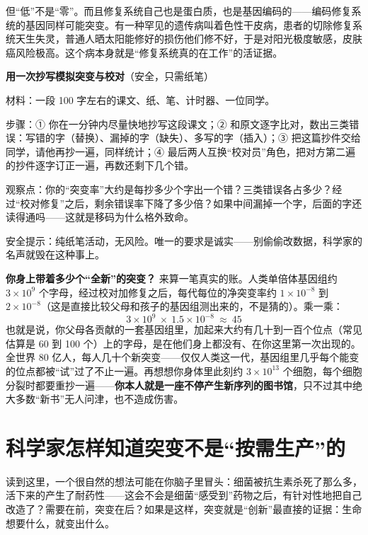 但“低”不是“零”。而且修复系统自己也是蛋白质，也是基因编码的——编码修复系统的基因同样可能突变。有一种罕见的遗传病叫着色性干皮病，患者的切除修复系统天生失灵，普通人晒太阳能修好的损伤他们修不好，于是对阳光极度敏感，皮肤癌风险极高。这个病本身就是“修复系统真的在工作”的活证据。

\begin{shiyan}
\textbf{用一次抄写模拟突变与校对}（安全，只需纸笔）

材料：一段 100 字左右的课文、纸、笔、计时器、一位同学。

步骤：① 你在一分钟内尽量快地抄写这段课文；② 和原文逐字比对，数出三类错误：写错的字（替换）、漏掉的字（缺失）、多写的字（插入）；③ 把这篇抄件交给同学，请他再抄一遍，同样统计；④ 最后两人互换“校对员”角色，把对方第二遍的抄件逐字订正一遍，再数还剩下几个错。

观察点：你的“突变率”大约是每抄多少个字出一个错？三类错误各占多少？经过“校对修复”之后，剩余错误率下降了多少倍？如果中间漏掉一个字，后面的字还读得通吗——这就是移码为什么格外致命。

安全提示：纯纸笔活动，无风险。唯一的要求是诚实——别偷偷改数据，科学家的名声就毁在这种事上。
\end{shiyan}

\begin{qiaoliang}
\textbf{你身上带着多少个“全新”的突变？} 来算一笔真实的账。人类单倍体基因组约 $3\times 10^{9}$ 个字母，经过校对加修复之后，每代每位的净突变率约 $1\times 10^{-8}$ 到 $2\times 10^{-8}$（这是直接比较父母和孩子的基因组测出来的，不是猜的）。乘一乘：
\[
3\times 10^{9}\ \times\ 1.5\times 10^{-8}\ \approx\ 45
\]
也就是说，你父母各贡献的一套基因组里，加起来大约有几十到一百个位点（常见估算是 60 到 100 个）上的字母，是在他们身上都没有、在你这里第一次出现的。全世界 80 亿人，每人几十个新突变——仅仅人类这一代，基因组里几乎每个能变的位点都被“试”过了不止一遍。再想想你身体里此刻约 $3\times 10^{13}$ 个细胞，每个细胞分裂时都要重抄一遍——\textbf{你本人就是一座不停产生新序列的图书馆}，只不过其中绝大多数“新书”无人问津，也不造成伤害。
\end{qiaoliang}

\section{科学家怎样知道突变不是“按需生产”的}

读到这里，一个很自然的想法可能在你脑子里冒头：细菌被抗生素杀死了那么多，活下来的产生了耐药性——这会不会是细菌“感受到”药物之后，有针对性地把自己改造了？需要在前，突变在后？如果是这样，突变就是“创新”最直接的证据：生命想要什么，就变出什么。

